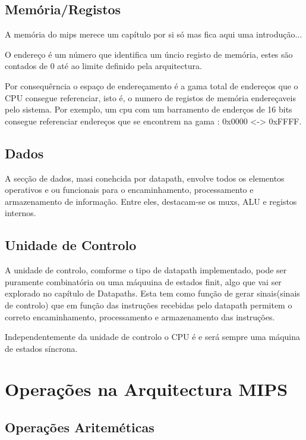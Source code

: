 \documentclass[10pt,a4paper]{book}
\begin{document}
	\section{Memória/Registos}

		A memória do mips merece um capítulo por si só mas fica aqui uma introdução...

		O endereço é um número que identifica um úncio registo de memória, estes são contados de 0 até ao limite definido pela arquitectura.

		Por consequêrncia o espaço de endereçamento é a gama total de endereços que o CPU consegue referenciar, isto é, o numero de registos de memória endereçaveis pelo sistema. Por exemplo, um cpu com um barramento de enderços de 16 bits consegue referenciar endereços que se encontrem na gama : 0x0000 <-> 0xFFFF.

	\section{Dados}

		A secção de dados, masi conehcida por datapath, envolve todos os elementos operativos e ou funcionais para o encaminhamento, processamento e armazenamento de informação. Entre eles, destacam-se os muxs, ALU e registos internos.

	\section{Unidade de Controlo}

		A unidade de controlo, comforme o tipo de datapath implementado, pode ser puramente combinatória ou uma máquuina de estados finit, algo que vai ser explorado no capítulo de Datapaths. Esta tem como função de gerar sinais(sinais de controlo) que em função das instruções recebidas pelo datapath permitem o correto encaminhamento, processamento e armazenamento das instruções.

		Independentemente da unidade de controlo o CPU é e será sempre uma máquina de estados síncrona.








 \chapter{Operações na Arquitectura MIPS}

	\section{Operações Ariteméticas}
\end{document}
